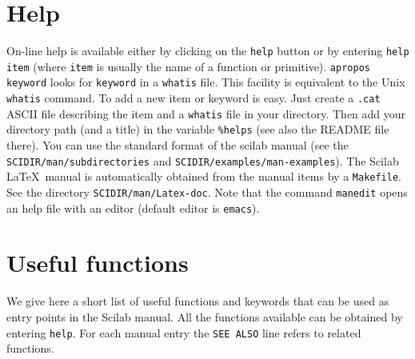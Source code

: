 \section{Help}
On-line help is available either by clicking on the 
{\tt help}
button or by entering {\tt help item} (where {\tt item} is usually the 
name of a function or primitive). {\tt apropos
keyword} looks 
for {\tt keyword} in a {\tt whatis} file. This facility is equivalent 
to the Unix 
{\tt whatis} command. To add a new item or keyword is easy.
Just create a {\tt .cat} ASCII file describing the item and a 
{\tt whatis} file in your directory. 
Then add your directory path
(and a title) in the variable \verb!%helps! (see also the README file
there). You can use the standard format of the scilab manual
(see the {\tt SCIDIR/man/subdirectories} 
and {\tt SCIDIR/examples/man-examples}).
The Scilab \LaTeX\   manual is automatically obtained from the
manual items by a {\tt Makefile}. 
See the directory {\tt SCIDIR/man/Latex-doc}. Note that the command
{\tt manedit} opens an help file with an editor (default editor
is {\tt emacs}).

\section{Useful functions}

We give here a short list of useful functions and keywords that can be used
as entry points in the Scilab manual. All the functions available 
can be obtained by entering {\tt help}. For each manual entry the
{\tt SEE ALSO} line refers to related functions.

